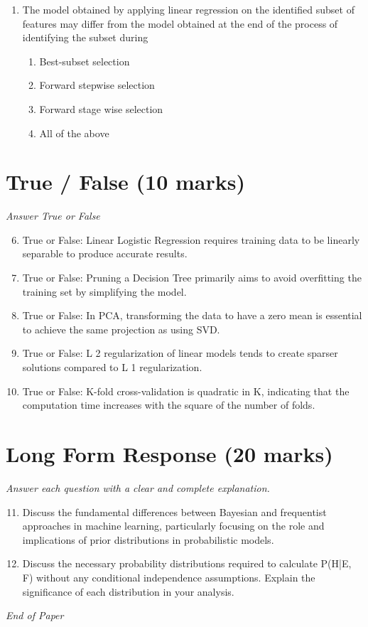 \documentclass[12pt]{article}
\begin{document}
\begin{enumerate}[label=\arabic*.]
\begin{enumerate}[label=(\alph*)]
    \item None of the above
\end{enumerate}
\item The model obtained by applying linear regression on the identified subset of features may differ from the model obtained at the end of the process of identifying the subset during
\begin{enumerate}[label=(\alph*)]
    \item Best-subset selection
    \item Forward stepwise selection
    \item Forward stage wise selection
    \item All of the above
\end{enumerate}
\end{enumerate}

\section*{True / False (10 marks)}
\textit{Answer True or False}
\begin{enumerate}[label=\arabic*.]
\setcounter{enumi}{5}
\item True or False: Linear Logistic Regression requires training data to be linearly separable to produce accurate results.
\item True or False: Pruning a Decision Tree primarily aims to avoid overfitting the training set by simplifying the model.
\item True or False: In PCA, transforming the data to have a zero mean is essential to achieve the same projection as using SVD.
\item True or False: L 2 regularization of linear models tends to create sparser solutions compared to L 1 regularization.
\item True or False: K-fold cross-validation is quadratic in K, indicating that the computation time increases with the square of the number of folds.
\end{enumerate}

\section*{Long Form Response (20 marks)}
\textit{Answer each question with a clear and complete explanation.}
\begin{enumerate}[label=\arabic*.]
\setcounter{enumi}{10}
\item Discuss the fundamental differences between Bayesian and frequentist approaches in machine learning, particularly focusing on the role and implications of prior distributions in probabilistic models.
\item Discuss the necessary probability distributions required to calculate P(H|E, F) without any conditional independence assumptions. Explain the significance of each distribution in your analysis.
\end{enumerate}

\vfill
\noindent\textit{End of Paper}
\end{document}
